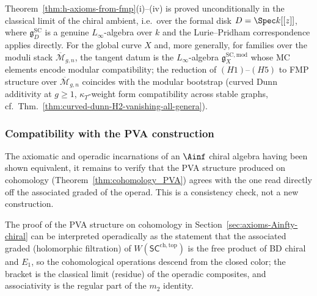 \begin{remark}[Scope]
\label{rem:fmp-scope}
Theorem~\ref{thm:h-axioms-from-fmp}(i)--(iv) is proved
unconditionally in the classical limit of the chiral ambient,
i.e.\ over the formal disk $D = \Spec k[[z]]$, where
$\mathfrak g^{\mathrm{SC}}_D$ is a genuine $L_\infty$-algebra over
$k$ and the Lurie--Pridham correspondence applies directly. For
the global curve $X$ and, more generally, for families over the
moduli stack $\overline{\mathcal M}_{g,n}$, the tangent datum is
the $L_\infty$-algebra
$\mathfrak g^{\mathrm{SC},\mathrm{mod}}_X$ whose MC elements
encode modular compatibility; the reduction of $(H1)$--$(H5)$ to
FMP structure over $\overline{\mathcal M}_{g,n}$ coincides with
the modular bootstrap (curved Dunn additivity at
$g\ge 1$, $\kappa_T$-weight form compatibility across stable
graphs, cf.~Thm.~\ref{thm:curved-dunn-H2-vanishing-all-genera}).
\end{remark}

\subsubsection{Compatibility with the PVA construction}
\label{subsec:compat-PVA}

The axiomatic and operadic incarnations of an $\Ainf$ chiral
algebra having been shown equivalent, it remains to verify that
the PVA structure produced on cohomology
(Theorem~\ref{thm:cohomology_PVA}) agrees with the one read
directly off the associated graded of the operad. This is a
consistency check, not a new construction.

The proof of the PVA structure on cohomology in
Section~\ref{sec:axioms-Ainfty-chiral} can be interpreted
operadically as the statement that the associated graded
(holomorphic filtration) of $W(\mathsf{SC}^{\mathrm{ch,top}})$ is
the free product of BD chiral and $E_1$, so the cohomological
operations descend from the closed color; the bracket is the
classical limit (residue) of the operadic composites, and
associativity is the regular part of the $m_2$ identity.

